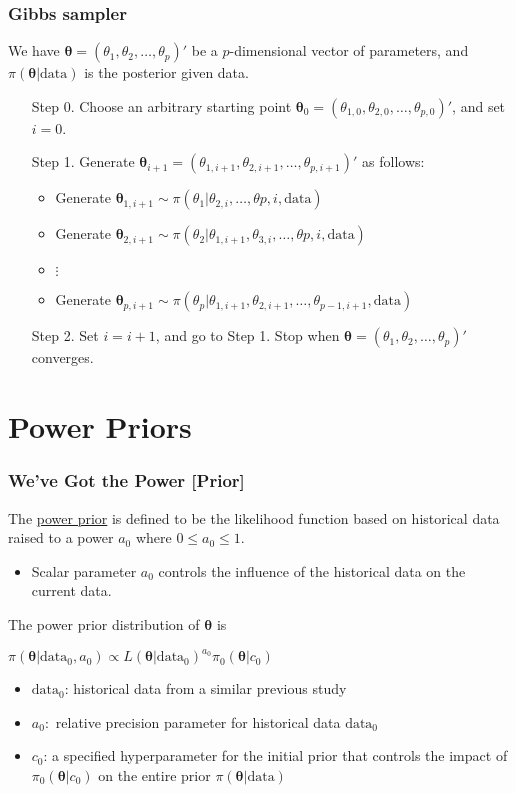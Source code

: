 \documentclass{beamer}
\begin{document}
\begin{frame}
\frametitle{Gibbs sampler}
We have $\pmb{\theta} = (\theta_1, \theta_2, \ldots, \theta_p)'$ be a $p$-dimensional vector of parameters, and $\pi(\pmb{\theta}|\text{data})$ is the posterior given data. 
\begin{enumerate}
\item[Step 0.] Choose an arbitrary starting point $\pmb{\theta}_{0} = (\theta_{1,0}, \theta_{2,0}, \ldots, \theta_{p,0})'$, and set $i = 0$.
\item [Step 1.] Generate $\pmb{\theta}_{i+1} = (\theta_{1,i+1}, \theta_{2,i+1}, \ldots, \theta_{p,i+1})'$ as follows:
	\begin{itemize}
	\item Generate $\pmb{\theta}_{1,i+1} \sim \pi(\theta_1|\theta_{2,i}, \ldots, \theta{p,i},\text{data})$
	\item Generate $\pmb{\theta}_{2,i+1} \sim \pi(\theta_2|\theta_{1,i+1}, \theta_{3,i}, \ldots, \theta{p,i},\text{data})$
	\item $\vdots$
	\item Generate $\pmb{\theta}_{p,i+1} \sim \pi(\theta_p|\theta_{1,i+1}, \theta_{2,i+1}, \ldots, \theta_{p-1,i+1}, \text{data})$
	\end{itemize}
\item [Step 2.] Set $i = i+1$, and go to Step 1.
Stop when $\pmb{\theta} = (\theta_1, \theta_2, \ldots, \theta_p)'$ converges.\footnotemark[1]
\end{enumerate}
\end{frame}

\section{Power Priors}
\begin{frame}
\frametitle{We've Got the Power [Prior]}
The \underline{power prior} is defined to be the likelihood function based on historical data raised to a power $a_{0}$ where $0 \leq a_0 \leq 1$. 
\begin{itemize}
\item Scalar parameter $a_0$ controls the influence of the historical data on the current data.  
\end{itemize}
The power prior distribution of $\pmb{\theta}$ is 
\begin{center}
$\pi(\pmb{\theta}|\text{data}_0, a_0) \propto L(\pmb{\theta}|\text{data}_0)^{a_0}\pi_0(\pmb{\theta}|c_{0})$
\end{center}
\begin{itemize}
\item $\text{data}_0$: historical data from a similar previous study 
\item $a_0:$ relative precision parameter for historical data $\text{data}_0$
\item $c_0$: a specified hyperparameter for the initial prior that controls the impact of $\pi_0(\pmb{\theta}|c_{0})$ on the entire prior $\pi(\pmb{\theta}|\text{data})$
\end{itemize}
\end{frame}
\end{document}
